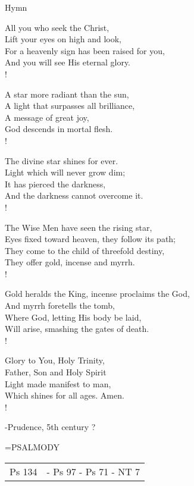 Hymn
\begin{cverse}
All you who seek the Christ,\\
Lift your eyes on high and look,\\
For a heavenly sign has been raised for you,\\
And you will see His eternal glory.\\!

A star more radiant than the sun,\\
A light that surpasses all brilliance,\\
A message of great joy,\\
God descends in mortal flesh.\\!

The divine star shines for ever.\\
Light which will never grow dim;\\
It has pierced the darkness,\\
And the darkness cannot overcome it.\\!

The Wise Men have seen the rising star,\\
Eyes fixed toward heaven, they follow its path;\\
They come to the child of threefold destiny,\\
They offer gold, incense and myrrh.\\!

Gold heralds the King, incense proclaims the God,\\
And myrrh foretells the tomb,\\
Where God, letting His body be laid,\\
Will arise, smashing the gates of death.\\!

Glory to You, Holy Trinity,\\
Father, Son and Holy Spirit\\
Light made manifest to man,\\
Which shines for all ages. Amen.\\!
\end{cverse}
-Prudence, 5th century ?

\hangindent=\parindent \small{PSALMODY}
\begin{center}
\begin{tabular}{ l l }
Ps 134 &  - Ps 97 - Ps 71 - NT 7\\
\end{tabular}
\end{center}		


